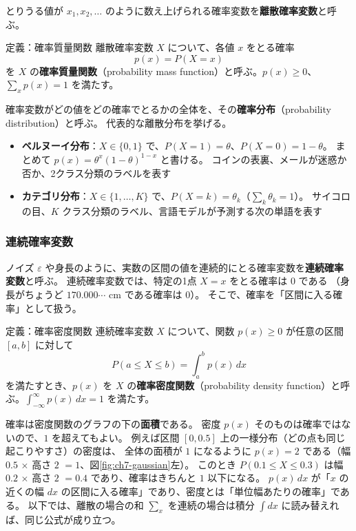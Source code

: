 とりうる値が $x_1, x_2, \ldots$ のように数え上げられる確率変数を\textbf{離散確率変数}と呼ぶ。

\begin{itembox}[l]{定義：確率質量関数}
離散確率変数 $X$ について、各値 $x$ をとる確率
\begin{equation}
  p(x) = P(X = x)
\end{equation}
を $X$ の\textbf{確率質量関数}（probability mass function）と呼ぶ。$p(x) \geq 0$、$\sum_x p(x) = 1$ を満たす。
\end{itembox}

確率変数がどの値をどの確率でとるかの全体を、その\textbf{確率分布}（probability distribution）と呼ぶ。
代表的な離散分布を挙げる。
\begin{itemize}
  \item \textbf{ベルヌーイ分布}：$X \in \{0, 1\}$ で、$P(X = 1) = \theta$、$P(X = 0) = 1 - \theta$。
    まとめて $p(x) = \theta^x (1 - \theta)^{1 - x}$ と書ける。
    コインの表裏、メールが迷惑か否か、2クラス分類のラベルを表す
  \item \textbf{カテゴリ分布}：$X \in \{1, \ldots, K\}$ で、$P(X = k) = \theta_k$（$\sum_k \theta_k = 1$）。
    サイコロの目、$K$ クラス分類のラベル、言語モデルが予測する次の単語を表す
\end{itemize}

\subsubsection{連続確率変数}

ノイズ $\varepsilon$ や身長のように、実数の区間の値を連続的にとる確率変数を\textbf{連続確率変数}と呼ぶ。
連続確率変数では、特定の1点 $X = x$ をとる確率は $0$ である
（身長がちょうど $170.000\cdots$ cm である確率は $0$）。
そこで、確率を「区間に入る確率」として扱う。

\begin{itembox}[l]{定義：確率密度関数}
連続確率変数 $X$ について、関数 $p(x) \geq 0$ が任意の区間 $[a, b]$ に対して
\begin{equation}
  P(a \leq X \leq b) = \int_a^b p(x)\,dx
  \label{eq:ch7-pdf}
\end{equation}
を満たすとき、$p(x)$ を $X$ の\textbf{確率密度関数}（probability density function）と呼ぶ。$\int_{-\infty}^{\infty} p(x)\,dx = 1$ を満たす。
\end{itembox}

確率は密度関数のグラフの下の\textbf{面積}である。
密度 $p(x)$ そのものは確率ではないので、$1$ を超えてもよい。
例えば区間 $[0, 0.5]$ 上の一様分布（どの点も同じ起こりやすさ）の密度は、
全体の面積が $1$ になるように $p(x) = 2$ である（幅 $0.5$ $\times$ 高さ $2$ $= 1$、図\ref{fig:ch7-gaussian}左）。
このとき $P(0.1 \leq X \leq 0.3)$ は幅 $0.2$ $\times$ 高さ $2$ $= 0.4$ であり、確率はきちんと $1$ 以下になる。
$p(x)\,dx$ が「$x$ の近くの幅 $dx$ の区間に入る確率」であり、密度とは「単位幅あたりの確率」である。
以下では、離散の場合の和 $\sum_x$ を連続の場合は積分 $\int dx$ に読み替えれば、同じ公式が成り立つ。

